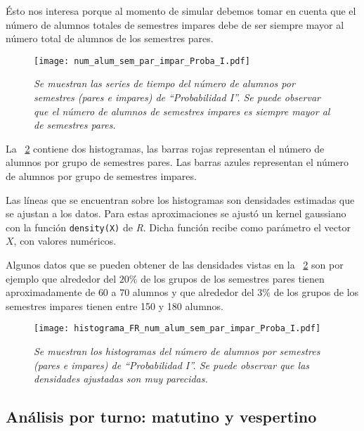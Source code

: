 Ésto nos interesa porque al momento de simular debemos tomar en cuenta que el número de alumnos totales de semestres impares debe de ser siempre mayor al número total de alumnos de los semestres pares.

\begin{figure}[H]
\centering
\texttt{[image: num\_alum\_sem\_par\_impar\_Proba\_I.pdf]} %
\caption[\textit{Número de alumnos por semestres pares e impares: Probabilidad I}]{\textit{Se muestran las series de tiempo del número de alumnos por semestres (pares e impares) de ``Probabilidad I''. Se puede observar que el número de alumnos de semestres impares es siempre mayor al de semestres pares.}}\label{ParImparProbaI}
\end{figure}

La \figurename{~\ref{HistAlumParImparProbaI}} contiene dos histogramas, las barras rojas representan el número de alumnos por grupo de semestres pares. Las barras azules representan el número de alumnos por grupo de semestres impares.

Las líneas que se encuentran sobre los histogramas son densidades estimadas que se ajustan a los datos. Para estas aproximaciones se ajustó un kernel gaussiano con la función \verb+density(X)+ de \textit{R}. Dicha función recibe como parámetro el vector $X$, con valores numéricos.

Algunos datos que se pueden obtener de las densidades vistas en la \figurename{~\ref{HistAlumParImparProbaI}} son por ejemplo que alrededor del $20\%$ de los grupos de los semestres pares tienen aproximadamente de $60$ a $70$ alumnos y que alrededor del $3\%$ de los grupos de los semestres impares tienen entre 150 y 180 alumnos. %

\begin{figure}[h]
\centering
\texttt{[image: histograma\_FR\_num\_alum\_sem\_par\_impar\_Proba\_I.pdf]} %
\caption[\textit{Histogramas del número de alumnos por semestre: Probabilidad I}]{\textit{Se muestran los histogramas del número de alumnos por semestres (pares e impares) de ``Probabilidad I''. Se puede observar que las densidades ajustadas son muy parecidas.}}\label{HistAlumParImparProbaI}
\end{figure}

\subsection{Análisis por turno: matutino y vespertino}

